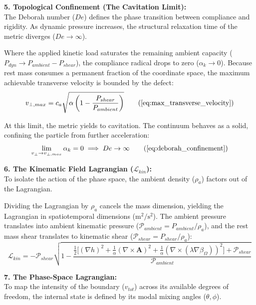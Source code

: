 \vspace{0.2 cm}

\textbf{5. Topological Confinement (The Cavitation Limit):} \\
The Deborah number ($De$) defines the phase transition between compliance and rigidity. As dynamic pressure increases, the structural relaxation time of the metric diverges ($De \to \infty$). 

Where the applied kinetic load saturates the remaining ambient capacity ($P_{dyn} \to P_{ambient} - P_{shear}$), the compliance radical drops to zero ($\alpha_k \to 0$). Because rest mass consumes a permanent fraction of the coordinate space, the maximum achievable transverse velocity is bounded by the defect:
\begin{equation}
    v_{\perp, max} = c_a \sqrt{\alpha \left( 1 - \frac{P_{shear}}{P_{ambient}} \right)} \tag{\ref{eq:max_transverse_velocity}}
\end{equation}

At this limit, the metric yields to cavitation. The continuum behaves as a solid, confining the particle from further acceleration:
\begin{equation}
    \lim_{v_\perp \to v_{\perp, max}} \alpha_k = 0 \implies De \to \infty \tag{\ref{eq:deborah_confinement}}
\end{equation}

\vspace{0.2 cm}

\textbf{6. The Kinematic Field Lagrangian ($\mathcal{L}_{kin}$):} \\
To isolate the action of the phase space, the ambient density ($\rho_a$) factors out of the Lagrangian. 

Dividing the Lagrangian by $\rho_a$ cancels the mass dimension, yielding the Lagrangian in spatiotemporal dimensions ($\text{m}^2/\text{s}^2$). The ambient pressure translates into ambient kinematic pressure ($\mathcal{P}_{ambient} = P_{ambient}/\rho_a$), and the rest mass shear translates to kinematic shear ($\mathcal{P}_{shear} = P_{shear}/\rho_a$):
\begin{equation}
    \mathcal{L}_{kin} = - \mathcal{P}_{shear} \sqrt{1 - \frac{\frac{1}{2} \Big[ (\nabla h)^2 + \frac{1}{\alpha}(\nabla \times \mathbf{A})^2 + \frac{1}{\alpha}(\nabla \times (\lambda \nabla \beta_\Omega))^2 \Big] + \mathcal{P}_{shear}}{\mathcal{P}_{ambient}}} \label{eq:kinematic_lagrangian}
\end{equation}

\textbf{7. The Phase-Space Lagrangian:} \\
To map the intensity of the boundary ($v_{tot}$) across its available degrees of freedom, the internal state is defined by its modal mixing angles ($\theta, \phi$). 

